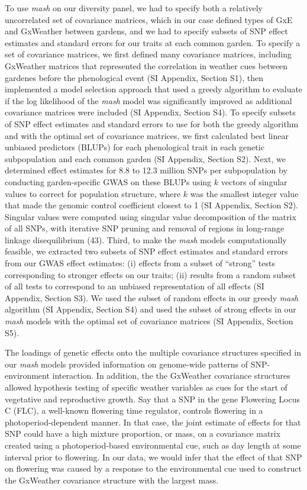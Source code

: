 \documentclass[
  9pt,
  twocolumn,
  twoside]{pnas-new}
\begin{document}
To use \emph{mash} on our diversity panel, we had to specify both a
relatively uncorrelated set of covariance matrices, which in our case
defined types of GxE and GxWeather between gardens, and we had to
specify subsets of SNP effect estimates and standard errors for our
traits at each common garden. To specify a set of covariance matrices,
we first defined many covariance matrices, including GxWeather matrices
that represented the correlation in weather cues between gardenes before
the phenological event (SI Appendix, Section S1), then implemented a
model selection approach that used a greedy algorithm to evaluate if the
log likelihood of the \emph{mash} model was significantly improved as
additional covariance matrices were included (SI Appendix, Section S4).
To specify subsets of SNP effect estimates and standard errors to use
for both the greedy algorithm and with the optimal set of covariance
matrices, we first calculated best linear unbiased predictors (BLUPs)
for each phenological trait in each genetic subpopulation and each
common garden (SI Appendix, Section S2). Next, we determined effect
estimates for 8.8 to 12.3 million SNPs per subpopulation by conducting
garden-specific GWAS on these BLUPs using \(k\) vectors of singular
values to correct for population structure, where \(k\) was the smallest
integer value that made the genomic control coefficient closest to 1 (SI
Appendix, Section S2). Singular values were computed using singular
value decomposition of the matrix of all SNPs, with iterative SNP
pruning and removal of regions in long-range linkage disequilibrium
(43). Third, to make the \emph{mash} models computationally feasible, we
extracted two subsets of SNP effect estimates and standard errors from
our GWAS effect estimates: (i) effects from a subset of ``strong'' tests
corresponding to stronger effects on our traits; (ii) results from a
random subset of all tests to correspond to an unbiased representation
of all effects (SI Appendix, Section S3). We used the subset of random
effects in our greedy \emph{mash} algorithm (SI Appendix, Section S4)
and used the subset of strong effects in our \emph{mash} models with the
optimal set of covariance matrices (SI Appendix, Section S5).

The loadings of genetic effects onto the multiple covariance structures
specified in our \emph{mash} models provided information on genome-wide
patterns of SNP-environment interaction. In addition, the the GxWeather
covariance structures allowed hypothesis testing of specific weather
variables as cues for the start of vegetative and reproductive growth.
Say that a SNP in the gene Flowering Locus C (FLC), a well-known
flowering time regulator, controls flowering in a photoperiod-dependent
manner. In that case, the joint estimate of effects for that SNP could
have a high mixture proportion, or mass, on a covariance matrix created
using a photoperiod-based environmental cue, such as day length at some
interval prior to flowering. In our data, we would infer that the effect
of that SNP on flowering was caused by a response to the environmental
cue used to construct the GxWeather covariance structure with the
largest mass.
\end{document}
